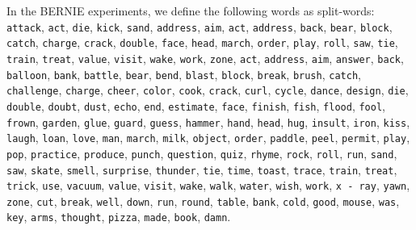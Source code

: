 \documentclass[a4paper,12pt,oneside,openright]{report}
\begin{document}
In the BERNIE experiments, we define the following words as split-words: \\

\Verb#attack#, \Verb#act#, \Verb#die#, \Verb#kick#, \Verb#sand#, \Verb#address#, \Verb#aim#, \Verb#act#, \Verb#address#, \Verb#back#, \Verb#bear#, \Verb#block#, \Verb#catch#, \Verb#charge#, \Verb#crack#, \Verb#double#, \Verb#face#, \Verb#head#, \Verb#march#, \Verb#order#, \Verb#play#, \Verb#roll#, \Verb#saw#, \Verb#tie#, \Verb#train#, \Verb#treat#, \Verb#value#, \Verb#visit#, \Verb#wake#, \Verb#work#, \Verb#zone#, \Verb#act#, \Verb#address#, \Verb#aim#, \Verb#answer#, \Verb#back#, \Verb#balloon#, \Verb#bank#, \Verb#battle#, \Verb#bear#, \Verb#bend#, \Verb#blast#, \Verb#block#, \Verb#break#, \Verb#brush#, \Verb#catch#, \Verb#challenge#, \Verb#charge#, \Verb#cheer#, \Verb#color#, \Verb#cook#, \Verb#crack#, \Verb#curl#, \Verb#cycle#, \Verb#dance#, \Verb#design#, \Verb#die#, \Verb#double#, \Verb#doubt#, \Verb#dust#, \Verb#echo#, \Verb#end#, \Verb#estimate#, \Verb#face#, \Verb#finish#, \Verb#fish#, \Verb#flood#, \Verb#fool#, \Verb#frown#, \Verb#garden#, \Verb#glue#, \Verb#guard#, \Verb#guess#, \Verb#hammer#, \Verb#hand#, \Verb#head#, \Verb#hug#, \Verb#insult#, \Verb#iron#, \Verb#kiss#, \Verb#laugh#, \Verb#loan#, \Verb#love#, \Verb#man#, \Verb#march#, \Verb#milk#, \Verb#object#, \Verb#order#, \Verb#paddle#, \Verb#peel#, \Verb#permit#, \Verb#play#, \Verb#pop#, \Verb#practice#, \Verb#produce#, \Verb#punch#, \Verb#question#, \Verb#quiz#, \Verb#rhyme#, \Verb#rock#, \Verb#roll#, \Verb#run#, \Verb#sand#, \Verb#saw#, \Verb#skate#, \Verb#smell#, \Verb#surprise#, \Verb#thunder#, \Verb#tie#, \Verb#time#, \Verb#toast#, \Verb#trace#, \Verb#train#, \Verb#treat#, \Verb#trick#, \Verb#use#, \Verb#vacuum#, \Verb#value#, \Verb#visit#, \Verb#wake#, \Verb#walk#, \Verb#water#, \Verb#wish#, \Verb#work#, \Verb#x - ray#, \Verb#yawn#, \Verb#zone#, \Verb#cut#, \Verb#break#, \Verb#well#, \Verb#down#, \Verb#run#, \Verb#round#, \Verb#table#, \Verb#bank#, \Verb#cold#, \Verb#good#, \Verb#mouse#, \Verb#was#, \Verb#key#, \Verb#arms#, \Verb#thought#, \Verb#pizza#, \Verb#made#, \Verb#book#, \Verb#damn#.
\end{document}
